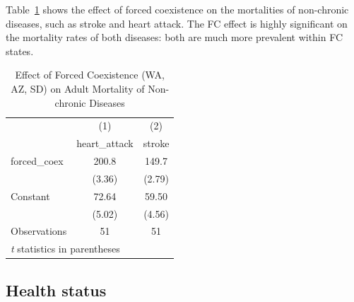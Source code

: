 \documentclass[12pt]{article}
\begin{document}
Table~\ref{fc2} shows the effect of forced coexistence on the mortalities of non-chronic diseases, such as stroke and heart attack.
The FC effect is highly significant on the mortality rates of both diseases: both are much more prevalent within FC states.


\begin{table}[htbp]\centering \caption{Effect of Forced Coexistence (WA, AZ, SD) on Adult Mortality of Non-chronic Diseases\label{fc2}} \begin{tabular}{l*{2}{c}} \toprule
                    &\multicolumn{1}{c}{(1)}&\multicolumn{1}{c}{(2)}\\
                    &\multicolumn{1}{c}{heart\_attack}&\multicolumn{1}{c}{stroke}\\
\midrule
forced\_coex         &       200.8&       149.7\\
                    &      (3.36)&      (2.79)\\
\addlinespace
Constant            &       72.64&       59.50\\
                    &      (5.02)&      (4.56)\\
\midrule
Observations        &          51&          51\\
\bottomrule
\multicolumn{3}{l}{\footnotesize \textit{t} statistics in parentheses}\\
\end{tabular}
\end{table}






\subsection{Health status}
\end{document}
